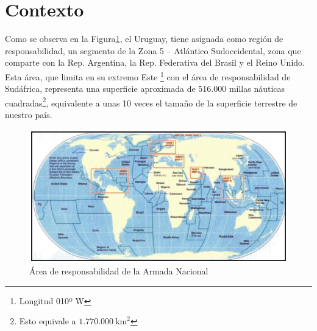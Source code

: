 \section{Contexto}\label{sec:contexto}

Como se observa en la Figura\ref{fig:area_responsabilidad_armada}, el Uruguay, tiene asignada como región de responsabilidad, un segmento de la Zona 5 – Atlántico Sudoccidental, 
zona que comparte con la Rep. Argentina, la Rep. Federativa del Brasil y el Reino Unido. Esta área, que limita en su extremo Este \footnote{Longitud 010º W} con el área de responsabilidad de Sudáfrica, 
representa una superficie aproximada de 516.000 millas náuticas cuadradas\footnote{Esto equivale a \(1.770.000\ \text{km}^2\)}, equivalente a unas 10 veces el tamaño de la superficie terrestre de nuestro país.\\

\begin{figure}
    \centering
    \includegraphics[width=\textwidth]{../imagenes/secciones/2-descripcion-del-problema-y-solucion/Regiones De Responsabilidad SAR.png} %
    \caption{Área de responsabilidad de la Armada Nacional}
    \label{fig:area_responsabilidad_armada}
\end{figure}


\FloatBarrier
